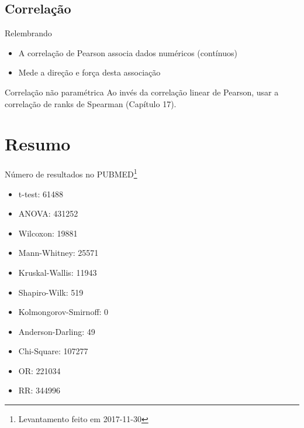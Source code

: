 \documentclass{beamer}
\begin{document}
\subsection{Correlação}

\begin{frame}{Relembrando}
  \begin{itemize}
  \item A correlação de Pearson associa dados numéricos (contínuos)
  \item Mede a direção e força desta associação
  \end{itemize}
  \begin{block}{Correlação não paramétrica}
    Ao invés da correlação linear de Pearson, usar a correlação de ranks de Spearman (Capítulo 17).
  \end{block}
\end{frame}

\section{Resumo}

\begin{frame}{Número de resultados no PUBMED\footnote{Levantamento feito em 2017-11-30}}
  \begin{itemize}
  \item t-test: 61488
  \item ANOVA: 431252
  \item Wilcoxon: 19881
  \item Mann-Whitney: 25571
  \item Kruskal-Wallis: 11943
  \item Shapiro-Wilk: 519
  \item Kolmongorov-Smirnoff: 0
  \item Anderson-Darling: 49
  \item Chi-Square: 107277
  \item OR: 221034
  \item RR: 344996
  \end{itemize}
\end{frame}
\end{document}
